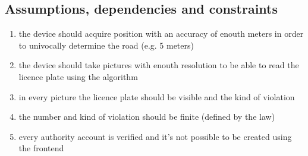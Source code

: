 \subsection{Assumptions, dependencies and constraints}
\begin{enumerate}[label=D]
\item the device should acquire position with an accuracy of enouth meters in order to univocally determine the road (e.g. 5 meters)
\item the device should take pictures with enouth resolution to be able to read the licence plate using the algorithm
\item in every picture the licence plate should be visible and the kind of violation
\item the number and kind of violation should be finite (defined by the law)
\item every authority account is verified and it's not possible to be created using the frontend
\
\end{enumerate}
